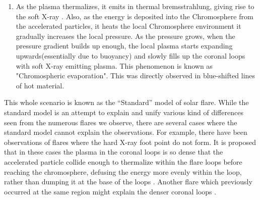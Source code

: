 \begin{enumerate}
    \item  As the plasma thermalizes, it emits in thermal bremsstrahlung, giving rise to the soft X-ray . Also, as the energy is deposited into the Chromosphere from the accelerated particles, it heats the local Chromosphere environment it gradually increases the local pressure. As the pressure grows, when the pressure gradient builds up enough, the local plasma starts expanding upwards(essentially due to buoyancy) and slowly fills up the coronal loops with soft X-ray emitting plasma. This phenomenon is known as "Chromospheric evaporation". This was directly observed in blue-shifted lines of hot material. 
\end{enumerate}

This whole scenario is known as the ``Standard'' model of solar flare. While the standard model is an attempt to explain and unify various kind of differences seen from the numerous flares we observe, there are several cases where the standard model cannot explain the observations. For example, there have been observations of flares where the hard X-ray foot point do not form. It is proposed that in these cases the plasma in the coronal loops is so dense that the accelerated particle collide enough to thermalize within the flare loops before reaching the chromosphere, defusing the energy more evenly within the loop, rather than dumping it at the base of the loops \citep{veronig02,veronig04}. Another flare which previously occurred at the same region might explain the denser coronal loops \citep{strong84,bone07}.  


